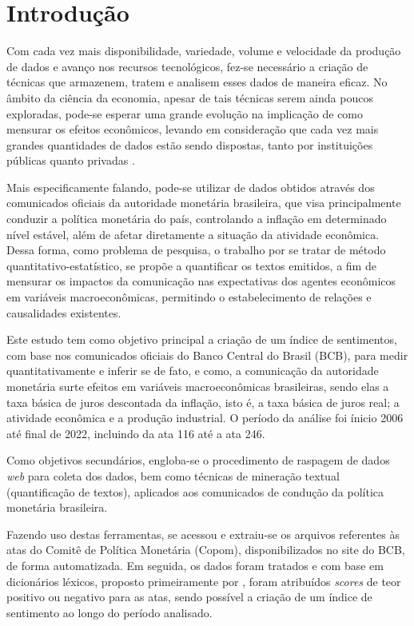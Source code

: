 
\chapter{Introdução}

Com cada vez mais disponibilidade, variedade, volume e velocidade da produção de dados e avanço nos recursos tecnológicos, fez-se necessário a criação de técnicas que armazenem, tratem e analisem esses dados de maneira eficaz. No âmbito da ciência da economia, apesar de tais técnicas serem ainda poucos exploradas, pode-se esperar uma grande evolução na implicação de como mensurar os efeitos econômicos, levando em consideração que cada vez mais grandes quantidades de dados estão sendo dispostas, tanto por instituições públicas quanto privadas \cite{hc_costa2016}.

Mais especificamente falando, pode-se utilizar de dados obtidos através dos comunicados oficiais da autoridade monetária brasileira, que visa principalmente conduzir a política monetária do país, controlando a inflação em determinado nível estável, além de afetar diretamente a situação da atividade econômica. Dessa forma, como problema de pesquisa, o trabalho por se tratar de método quantitativo-estatístico, se propõe a quantificar os textos emitidos, a fim de mensurar os impactos da comunicação nas expectativas dos agentes econômicos em variáveis macroeconômicas, permitindo o estabelecimento de relações e causalidades existentes.

Este estudo tem como objetivo principal a criação de um índice de sentimentos, com base nos comunicados oficiais do Banco Central do Brasil (BCB), para medir quantitativamente e inferir se de fato, e como, a comunicação da autoridade monetária surte efeitos em variáveis macroeconômicas brasileiras, sendo elas a taxa básica de juros descontada da inflação, isto é, a taxa básica de juros real; a atividade econômica e a produção industrial. O período da análise foi ínicio 2006 até final de 2022, incluindo da ata 116 até a ata 246.

Como objetivos secundários, engloba-se o procedimento de raspagem de dados \textit{web} para coleta dos dados, bem como técnicas de mineração textual (quantificação de textos), aplicados aos comunicados de condução da política monetária brasileira. 

Fazendo uso destas ferramentas, se acessou e extraiu-se os arquivos referentes às atas do Comitê de Política Monetária (Copom), disponibilizados no site do BCB, de forma automatizada. Em seguida, os dados foram tratados e com base em dicionários léxicos, proposto primeiramente por , foram atribuídos \textit{scores} de teor positivo ou negativo para as atas, sendo possível a criação de um índice de sentimento ao longo do período analisado.

